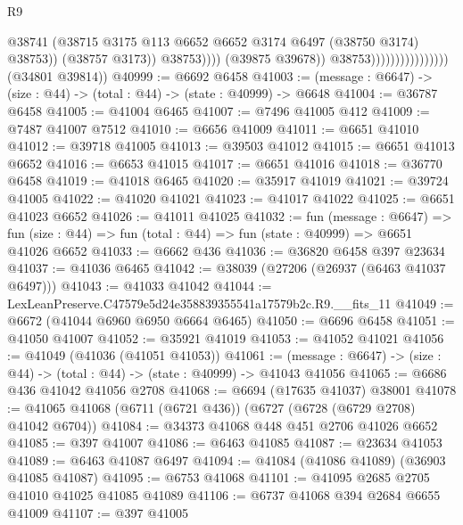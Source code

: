 \begin{lexlean}{R9}
\begin{coremodule}
                                                    @38741
                                                    (@38715
                                                      @3175
                                                      @113
                                                      @6652
                                                      @6652
                                                      @3174
                                                      @6497
                                                      (@38750 @3174)
                                                      @38753))
                                                  (@38757 @3173))
                                                @38753))))
                                        (@39875 @39678))
                                      @38753))))))))))))))))
      (@34801 @39814))
@40999 := @6692 @6458
@41003 := (message : @6647) -> (size : @44) -> (total : @44) -> (state : @40999) -> @6648
@41004 := @36787 @6458
@41005 := @41004 @6465
@41007 := @7496 @41005 @412
@41009 := @7487 @41007 @7512
@41010 := @6656 @41009
@41011 := @6651 @41010
@41012 := @39718 @41005
@41013 := @39503 @41012
@41015 := @6651 @41013 @6652
@41016 := @6653 @41015
@41017 := @6651 @41016
@41018 := @36770 @6458
@41019 := @41018 @6465
@41020 := @35917 @41019
@41021 := @39724 @41005
@41022 := @41020 @41021
@41023 := @41017 @41022
@41025 := @6651 @41023 @6652
@41026 := @41011 @41025
@41032 := fun (message : @6647) =>
  fun (size : @44) => fun (total : @44) => fun (state : @40999) => @6651 @41026 @6652
@41033 := @6662 @436
@41036 := @36820 @6458 @397 @23634
@41037 := @41036 @6465
@41042 := @38039 (@27206 (@26937 (@6463 @41037 @6497)))
@41043 := @41033 @41042
@41044 := LexLeanPreserve.C47579e5d24e358839355541a17579b2c.R9.__fits_11
@41049 := @6672 (@41044 @6960 @6950 @6664 @6465)
@41050 := @6696 @6458
@41051 := @41050 @41007
@41052 := @35921 @41019
@41053 := @41052 @41021
@41056 := @41049 (@41036 (@41051 @41053))
@41061 := (message : @6647) -> (size : @44) -> (total : @44) -> (state : @40999) -> @41043 @41056
@41065 := @6686 @436 @41042 @41056 @2708
@41068 := @6694 (@17635 @41037) @38001
@41078 := @41065 @41068 (@6711 (@6721 @436)) (@6727 (@6728 (@6729 @2708) @41042 @6704))
@41084 := @34373 @41068 @448 @451 @2706 @41026 @6652
@41085 := @397 @41007
@41086 := @6463 @41085
@41087 := @23634 @41053
@41089 := @6463 @41087 @6497
@41094 := @41084 (@41086 @41089) (@36903 @41085 @41087)
@41095 := @6753 @41068
@41101 := @41095 @2685 @2705 @41010 @41025 @41085 @41089
@41106 := @6737 @41068 @394 @2684 @6655 @41009
@41107 := @397 @41005

\end{coremodule}
\end{lexlean}
